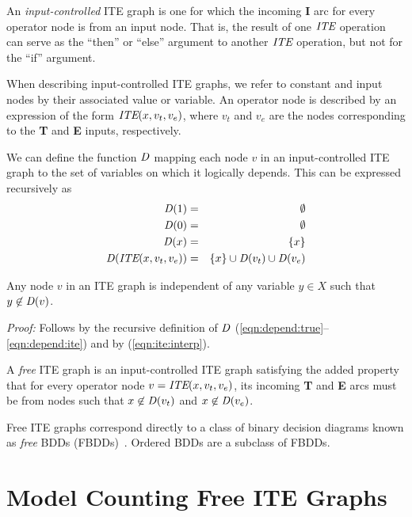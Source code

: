 \documentclass{llncs}
\newcommand{\tautology}{1}
\newcommand{\nil}{0}
\newcommand{\ite}{\mbox{\it ITE}}
\newcommand{\ifarg}{\textbf{I}}
\newcommand{\thenarg}{\textbf{T}}
\newcommand{\elsearg}{\textbf{E}}
\newcommand{\depend}{{\it D}}
\begin{document}
An {\em input-controlled} ITE graph is one for which the incoming \ifarg{} arc for every operator node is
from an input node.  That is, the result of one $\ite$ operation can
serve as the ``then'' or ``else'' argument to another $\ite$
operation, but not for the ``if'' argument.

When describing input-controlled ITE graphs, we refer to constant and input
nodes by their associated value or variable.  An operator node is described by an expression of the form
$\ite(x, v_t, v_e)$, where $v_t$ and $v_e$ are the
nodes corresponding to the \thenarg{} and \elsearg{} inputs, respectively.

We can define the function $\depend$ mapping each node
$v$ in an input-controlled ITE graph to the set of variables on which it logically depends.  This can be expressed recursively as
\begin{eqnarray}
\depend(\tautology) & = & \emptyset \label{eqn:depend:true}\\
\depend(\nil) & = & \emptyset \label{eqn:depend:false}\\
\depend(x) & = & \{x \} \label{eqn:depend:variable}\\
\depend(\ite(x, v_t, v_e)) & = & \{ x \} \cup \depend(v_t) \cup \depend(v_e) \label{eqn:depend:ite}
\end{eqnarray}  


\begin{lemma}
\label{lemma:independent:dset}
Any node $v$ in an ITE graph is independent of any variable $y \in X$ such that $y \not \in \depend(v)$.
\end{lemma}  
\noindent
{\em Proof:} Follows by the recursive definition of $\depend$ (\ref{eqn:depend:true}--\ref{eqn:depend:ite}) and by (\ref{eqn:ite:interp}).


A {\em free} ITE graph is an input-controlled ITE graph satisfying the added
property that for every operator node $v = \ite(x, v_t, v_e)$, its
incoming \thenarg{} and \elsearg{} arcs must be from nodes such that
$x \not \in \depend(v_t)$ and $x \not \in \depend(v_e)$.

Free ITE graphs correspond directly to a class of binary decision diagrams known as {\em free} BDDs (FBDDs)~\cite{gergov:ieeetc:1994}.  Ordered BDDs are a subclass of FBDDs.

\section{Model Counting Free ITE Graphs}
\end{document}
